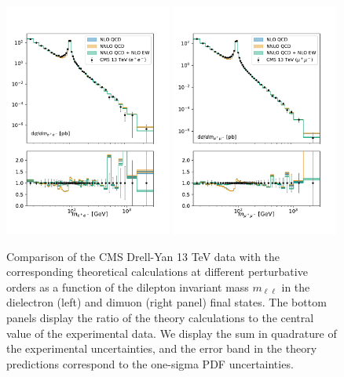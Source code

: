 \documentclass[withindex,glossary]{cam-thesis}
\begin{document}
\begin{figure}
  \centering
  \includegraphics[width=0.49\textwidth]{dy_figures/cms13_electron_thpred_w_pdf_errs.pdf}
\includegraphics[width=0.49\textwidth]{dy_figures/cms13_muon_thpred_w_pdf_errs.pdf}
\caption{\small Comparison of the CMS Drell-Yan
  13 TeV data with the corresponding theoretical calculations at different
  perturbative orders as a function of the
  dilepton invariant mass $m_{\ell\ell}$ in the dielectron (left)
  and dimuon (right panel) final states.
  The bottom panels display the ratio of the theory calculations
  to the central value of the experimental data.
  We display the sum in quadrature of the experimental uncertainties, and the error
  band in the theory predictions correspond to the one-sigma PDF uncertainties.
  \label{fig:dysm}}
\end{figure}
\end{document}
